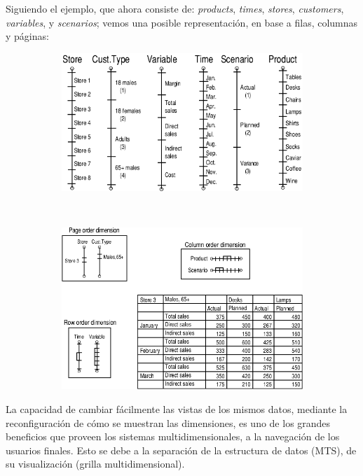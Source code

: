 \documentclass{fancyslides}
\begin{document}
\begin{frame}
\misc
{
Siguiendo el ejemplo, que ahora consiste de: \textit{products}, \textit{times}, \textit{stores}, \textit{customers}, \textit{variables}, y \textit{scenarios};
vemos una posible representación, en base a filas, columnas y páginas:
\begin{figure}
        \centering
        \begin{subfigure}[b]{0.5\textwidth}
                \includegraphics[width=\textwidth]{cube_8}
        \end{subfigure}%
        ~
        \begin{subfigure}[b]{0.55\textwidth}
                \includegraphics[width=\textwidth]{cube_9}
        \end{subfigure}
\end{figure}
}
\end{frame}

\begin{frame}
\misc
{
La capacidad de cambiar fácilmente las vistas de los mismos datos, mediante la reconfiguración de cómo se muestran las dimensiones, es uno de los grandes beneficios
que proveen los sistemas multidimensionales, a la navegación de los usuarios finales.
Esto se debe a la separación de la estructura de datos (MTS), de su visualización (grilla multidimensional).
}
\end{frame}
\end{document}
